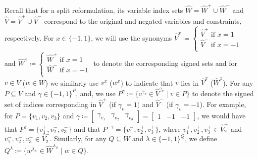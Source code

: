 \documentclass[pdflatex,sn-mathphys-num]{sn-jnl}%
\theoremstyle{thmstyleone}%
\theoremstyle{thmstylethree}%
\theoremstyle{thmstyletwo}%
\begin{document}
Recall that for a split reformulation, its variable index sets $\widehat{W} = \widehat{W}^+ \cup \widehat{W}^-$ and $\widehat{V} = \widehat{V}^+ \cup \widehat{V}^-$ correspond to the original and negated variables and constraints, respectively. For $x\in \{-1,1\}$, we will use the synonyms $\widehat{V}^x\coloneqq \begin{cases}
    \widehat{V}^+ \text{ if $x= 1$}\\
    \widehat{V}^- \text{ if $x=-1$}\\
\end{cases}$ and $\widehat{W}^x\coloneqq  \begin{cases}
    \widehat{W}^+ \text{ if $x= 1$}\\
    \widehat{W}^- \text{ if $x=-1$}\\
\end{cases}$ to denote the corresponding signed sets and for $v\in V$ ($w\in W$) we similarly use $v^x$ ($w^x$) to indicate that $v$ lies in $\widehat{V}^x$ ($\widehat{W}^x$).
For any $P\subseteq V$ and  $\gamma \in \{-1,1\}^{P}$, and, we use $P^\gamma \coloneqq \{ v^{\gamma_v} \in \widehat{V}^{\gamma_v} \mid v\in P \}$ to denote the signed set of indices corresponding in $\widehat{V}^+$ (if $\gamma_v = 1)$ and $\widehat{V}^-$ (if $\gamma_v = -1$).
For example, for $P=\{v_1,v_2,v_3\}$ and $\gamma \coloneqq \begin{bmatrix}
    \gamma_{v_1} & \gamma_{v_2} & \gamma_{v_3}
\end{bmatrix} = \begin{bmatrix}
    1 & -1 & -1
\end{bmatrix}$, we would have that $P^\gamma = \{v^+_1, v^-_2,v^-_3\}$ and that $P^{-\gamma} = \{v^-_1,v^+_2,v^+_3\}$, where $v^+_1,v^+_2,v^+_3 \in \widehat{V}^+_2$ and $v^-_1,v^-_2,v^-_3\in \widehat{V}^-_2$. Similarly, for any $Q\subseteq W$ and $\lambda \in \{-1,1\}^{Q}$, we define $Q^\lambda \coloneqq \{w^{\lambda_w} \in \widehat{W}^{\lambda_w} \mid w\in Q\}$.\\
\end{document}
